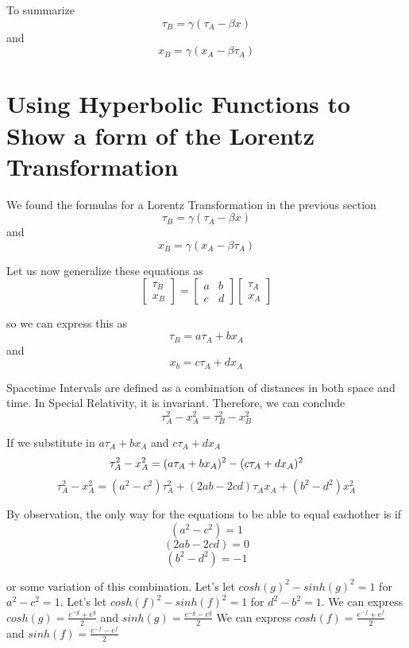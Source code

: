 \documentclass{article}
\begin{document}
To summarize
\[
  \tau_B = \gamma ( \tau_A - \beta x)
\]
and
\[
  x_B = \gamma (x_A - \beta \tau_A)
\]
\newpage
\section{Using Hyperbolic Functions to Show a form of the Lorentz Transformation}
We found the formulas for a Lorentz Transformation in the previous section
\[
  \tau_B = \gamma ( \tau_A - \beta x)
\]
and
\[
  x_B = \gamma (x_A - \beta \tau_A)
\]

Let us now generalize these equations as
\[
  \begin{bmatrix} 
    \tau_B \\
    x_B
  \end{bmatrix}
=
  \begin{bmatrix} 
    a & b \\
    c & d
  \end{bmatrix}
  \begin{bmatrix} 
    \tau_A \\
    x_A
  \end{bmatrix}
\]

so we can express this as
\[
  \tau_B = a\tau_A + bx_A
\]
and 
\[
  x_b = c\tau_A + dx_A
\]

Spacetime Intervals are defined as a combination of distances in both space and time. In Special Relativity, it is invariant. Therefore, we can conclude
\[
  \tau_A^2 - x_A^2 = \tau_B^2 - x_B^2
\]

If we substitute in \(a\tau_A + bx_A\) and \(c\tau_A + dx_A\)
\[
  \tau_A^2 - x_A^2 = (a\tau_A + bx_A)^2 - (c\tau_A + dx_A)^2 \newline
\]
\[
  \tau_A^2 - x_A^2 = (a^2 - c^2)\tau_A^2 + (2ab - 2cd)\tau_A x_A + (b^2 - d^2) x_A^2
\]

By observation, the only way for the equations to be able to equal eachother is if
\[
  (a^2 - c^2) = 1
\]
\[
  (2ab - 2cd) = 0
\]
\[
  (b^2 - d^2) = -1
\]

or some variation of this combination. \newline
Let's let \(cosh(g)^2 - sinh(g)^2 = 1\) for \(a^2 - c^2 = 1\). \newline
Let's let \(cosh(f)^2 - sinh(f)^2 = 1\) for \(d^2 - b^2 = 1\). \newline
We can express \(cosh(g) = \frac{e^{-g} + e^{g}}{2}\) and \(sinh(g) = \frac{e^{-g} - e^{g}}{2}\) \newline
We can express \(cosh(f) = \frac{e^{-f} + e^{f}}{2}\) and \(sinh(f) = \frac{e^{-f} - e^{f}}{2}\) \newline
\end{document}
